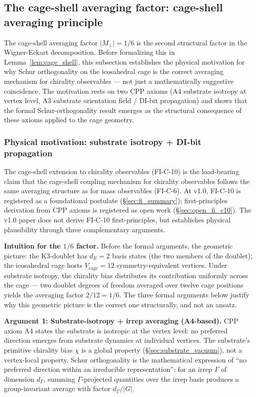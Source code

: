 \documentclass[11pt,letterpaper]{article}
\begin{document}
\subsection{The cage-shell averaging factor: cage-shell averaging principle}\label{sec:cage_shell_factor}

The cage-shell averaging factor $|M_\perp| = 1/6$ is the second structural factor in the Wigner-Eckart decomposition. Before formalizing this in Lemma~\ref{lem:cage_shell}, this subsection establishes the physical motivation for why Schur orthogonality on the icosahedral cage is the correct averaging mechanism for chirality observables --- not just a mathematically suggestive coincidence. The motivation rests on two CPP axioms (A4 substrate isotropy at vertex level, A3 substrate orientation field / DI-bit propagation) and shows that the formal Schur-orthogonality result emerges as the structural consequence of these axioms applied to the cage geometry.

\subsubsection{Physical motivation: substrate isotropy + DI-bit propagation}\label{sec:cage_shell_factor_motivation}

The cage-shell extension to chirality observables (FI-C-10) is the load-bearing claim that the cage-shell coupling mechanism for chirality observables follows the same averaging structure as for mass observables (FI-C-6). At v1.0, FI-C-10 is registered as a foundational postulate (\S\ref{sec:fi_summary}); first-principles derivation from CPP axioms is registered as open work (\S\ref{sec:open_fi_c10}). The v1.0 paper does not derive FI-C-10 first-principles, but establishes physical plausibility through three complementary arguments.

\textbf{Intuition for the $1/6$ factor.} Before the formal arguments, the geometric picture: the K3-doublet has $d_E = 2$ basis states (the two members of the doublet); the icosahedral cage hosts $V_\text{cage} = 12$ symmetry-equivalent vertices. Under substrate isotropy, the chirality bias distributes its contribution uniformly across the cage --- two doublet degrees of freedom averaged over twelve cage positions yields the averaging factor $2/12 = 1/6$. The three formal arguments below justify why this geometric picture is the correct one structurally, and not an ansatz.

\textbf{Argument 1: Substrate-isotropy + irrep averaging (A4-based).}
CPP axiom A4 states the substrate is isotropic at the vertex level: no preferred direction emerges from substrate dynamics at individual vertices. The substrate's primitive chirality bias $\chi$ is a global property (\S\ref{sec:substrate_vacuum}), not a vertex-local property. Schur orthogonality is the mathematical expression of ``no preferred direction within an irreducible representation'': for an irrep $\Gamma$ of dimension $d_\Gamma$, summing $\Gamma$-projected quantities over the irrep basis produces a group-invariant average with factor $d_\Gamma / |G|$.
\end{document}
